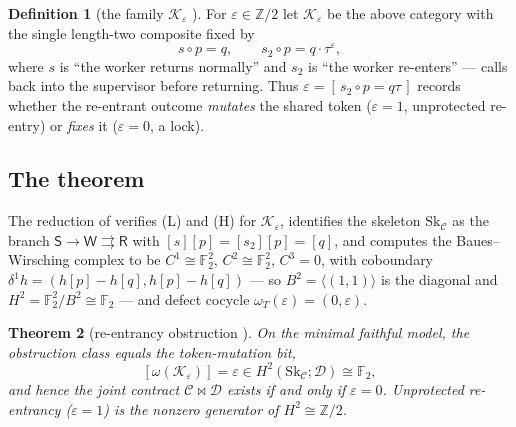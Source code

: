 \documentclass[11pt]{amsart}
\newtheorem{theorem}{Theorem}[section]
\theoremstyle{definition}
\newtheorem{definition}[theorem]{Definition}
\theoremstyle{remark}
\newcommand{\C}{\mathcal{C}}
\newcommand{\D}{\mathcal{D}}
\newcommand{\K}{\mathcal{K}}
\newcommand{\Sk}{\mathrm{Sk}}
\newcommand{\Sup}{\mathsf{S}}
\newcommand{\Wk}{\mathsf{W}}
\newcommand{\Rt}{\mathsf{R}}
\newcommand{\dir}{\mathcal{D}}
\newcommand{\FF}{\mathbb{F}_2}
\begin{document}
\begin{definition}[the family $\K_\varepsilon$ \cite{analytic}]\label{def:family}
For $\varepsilon\in\mathbb Z/2$ let $\K_\varepsilon$ be the above category with the single
length-two composite fixed by
\[
  s\circ p = q, \qquad s_2\circ p = q\cdot\tau^{\varepsilon},
\]
where $s$ is ``the worker returns normally'' and $s_2$ is ``the worker re-enters'' --- calls back
into the supervisor before returning. Thus $\varepsilon=[\,s_2\circ p=q\tau\,]$ records whether the
re-entrant outcome \emph{mutates} the shared token ($\varepsilon=1$, unprotected re-entry) or
\emph{fixes} it ($\varepsilon=0$, a lock).
\end{definition}

\subsection*{The theorem}
The reduction of \cite{analytic} verifies (L) and (H) for $\K_\varepsilon$, identifies the skeleton
$\Sk_\C$ as the branch $\Sup\to\Wk\rightrightarrows\Rt$ with $[s][p]=[s_2][p]=[q]$, and computes the
Baues--Wirsching complex to be $C^1\cong\FF^2$, $C^2\cong\FF^2$, $C^3=0$, with coboundary
$\delta^1h=(h[p]-h[q],h[p]-h[q])$ --- so $B^2=\langle(1,1)\rangle$ is the diagonal and
$H^2=\FF^2/B^2\cong\FF$ --- and defect cocycle $\omega_T(\varepsilon)=(0,\varepsilon)$.

\begin{theorem}[re-entrancy obstruction \cite{analytic}]\label{thm:anchor}
On the minimal faithful model, the obstruction class equals the token-mutation bit,
\[
  [\omega(\K_\varepsilon)]=\varepsilon \in H^2(\Sk_\C;\dir)\cong\FF,
\]
and hence the joint contract $\C\bowtie\D$ exists if and only if $\varepsilon=0$. Unprotected
re-entrancy ($\varepsilon=1$) is the nonzero generator of $H^2\cong\mathbb Z/2$.
\end{theorem}
\end{document}
